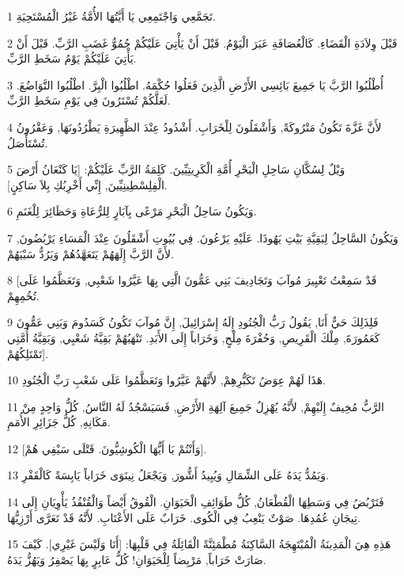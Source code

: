\par 1 تَجَمَّعِي وَاجْتَمِعِي يَا أَيَّتُهَا الأُمَّةُ غَيْرُ الْمُسْتَحِيَةِ.
\par 2 قَبْلَ وِلاَدَةِ الْقَضَاءِ. كَالْعُصَافَةِ عَبَرَ الْيَوْمُ. قَبْلَ أَنْ يَأْتِيَ عَلَيْكُمْ حُمُوُّ غَضَبِ الرَّبِّ. قَبْلَ أَنْ يَأْتِيَ عَلَيْكُمْ يَوْمُ سَخَطِ الرَّبِّ.
\par 3 أُطْلُبُوا الرَّبَّ يَا جَمِيعَ بَائِسِي الأَرْضِ الَّذِينَ فَعَلُوا حُكْمَهُ. اطْلُبُوا الْبِرَّ. اطْلُبُوا التَّوَاضُعَ. لَعَلَّكُمْ تُسْتَرُونَ فِي يَوْمِ سَخَطِ الرَّبِّ.
\par 4 لأَنَّ غَزَّةَ تَكُونُ مَتْرُوكَةً, وَأَشْقَلُونَ لِلْخَرَابِ. أَشْدُودُ عِنْدَ الظَّهِيرَةِ يَطْرُدُونَهَا, وَعَقْرُونُ تُسْتَأْصَلُ.
\par 5 وَيْلٌ لِسُكَّانِ سَاحِلِ الْبَحْرِ أُمَّةِ الْكَرِيتِيِّينَ. كَلِمَةُ الرَّبِّ عَلَيْكُمْ: [يَا كَنْعَانُ أَرْضَ الْفِلِسْطِينِيِّينَ, إِنِّي أَخْرِبُكِ بِلاَ سَاكِنٍ].
\par 6 وَيَكُونُ سَاحِلُ الْبَحْرِ مَرْعًى بِآبَارٍ لِلرُّعَاةِ وَحَظَائِرَ لِلْغَنَمِ.
\par 7 وَيَكُونُ السَّاحِلُ لِبَقِيَّةِ بَيْتِ يَهُوذَا. عَلَيْهِ يَرْعُونَ. فِي بُيُوتِ أَشْقَلُونَ عِنْدَ الْمَسَاءِ يَرْبُضُونَ, لأَنَّ الرَّبَّ إِلَهَهُمْ يَتَعَهَّدُهُمْ وَيَرُدُّ سَبْيَهُمْ.
\par 8 [قَدْ سَمِعْتُ تَعْيِيرَ مُوآبَ وَتَجَادِيفَ بَنِي عَمُّونَ الَّتِي بِهَا عَيَّرُوا شَعْبِي, وَتَعَظَّمُوا عَلَى تُخُمِهِمْ.
\par 9 فَلِذَلِكَ حَيٌّ أَنَا, يَقُولُ رَبُّ الْجُنُودِ إِلَهُ إِسْرَائِيلَ, إِنَّ مُوآبَ تَكُونُ كَسَدُومَ وَبَنِي عَمُّونَ كَعَمُورَةَ, مِلْكَ الْقَرِيصِ, وَحُفْرَةَ مِلْحٍ, وَخَرَاباً إِلَى الأَبَدِ. تَنْهَبُهُمْ بَقِيَّةُ شَعْبِي, وَبَقِيَّةُ أُمَّتِي تَمْتَلِكُهُمْ].
\par 10 هَذَا لَهُمْ عِوَضُ تَكَبُّرِهِمْ, لأَنَّهُمْ عَيَّرُوا وَتَعَظَّمُوا عَلَى شَعْبِ رَبِّ الْجُنُودِ.
\par 11 الرَّبُّ مُخِيفٌ إِلَيْهِمْ, لأَنَّهُ يُهْزِلُ جَمِيعَ آلِهَةِ الأَرْضِ, فَسَيَسْجُدُ لَهُ النَّاسُ, كُلُّ وَاحِدٍ مِنْ مَكَانِهِ, كُلُّ جَزَائِرِ الأُمَمِ.
\par 12 [وَأَنْتُمْ يَا أَيُّهَا الْكُوشِيُّونَ. قَتْلَى سَيْفِي هُمْ].
\par 13 وَيَمُدُّ يَدَهُ عَلَى الشِّمَالِ وَيُبِيدُ أَشُّورَ, وَيَجْعَلُ نِينَوَى خَرَاباً يَابِسَةً كَالْقَفْرِ.
\par 14 فَتَرْبُضُ فِي وَسَطِهَا الْقُطْعَانُ, كُلُّ طَوَائِفِ الْحَيَوَانِ. الْقُوقُ أَيْضاً وَالْقُنْفُذُ يَأْوِيَانِ إِلَى تِيجَانِ عُمُدِهَا. صَوْتٌ يَنْعِبُ فِي الْكُوى. خَرَابٌ عَلَى الأَعْتَابِ. لأَنَّهُ قَدْ تَعَرَّى أَرْزِيُّهَا.
\par 15 هَذِهِ هِيَ الْمَدِينَةُ الْمُبْتَهِجَةُ السَّاكِنَةُ مُطْمَئِنَّةً الْقَائِلَةُ فِي قَلْبِهَا: [أَنَا وَلَيْسَ غَيْرِي]. كَيْفَ صَارَتْ خَرَاباً, مَرْبِضاً لِلْحَيَوَانِ! كُلُّ عَابِرٍ بِهَا يَصْفِرُ وَيَهُزُّ يَدَهُ.

